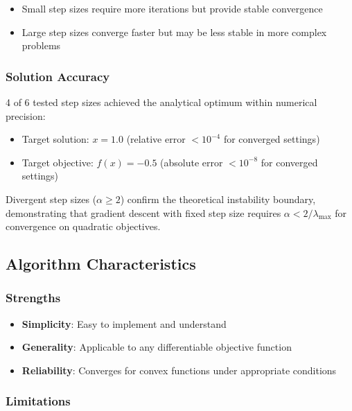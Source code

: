 \documentclass[
  english,
]{article}
\providecommand{\tightlist}{%
  \setlength{\itemsep}{0pt}\setlength{\parskip}{0pt}}
\begin{document}
\begin{itemize}
\tightlist
\item
  Small step sizes require more iterations but provide stable
  convergence
\item
  Large step sizes converge faster but may be less stable in more
  complex problems
\end{itemize}

\subsubsection{Solution Accuracy}\label{solution-accuracy}

4 of 6 tested step sizes achieved the analytical optimum within
numerical precision:

\begin{itemize}
\tightlist
\item
  Target solution: \(x = 1.0\) (relative error \(< 10^{-4}\) for
  converged settings)
\item
  Target objective: \(f(x) = -0.5\) (absolute error \(< 10^{-8}\) for
  converged settings)
\end{itemize}

Divergent step sizes (\(\alpha \geq 2\)) confirm the theoretical
instability boundary, demonstrating that gradient descent with fixed
step size requires \(\alpha < 2/\lambda_{\max}\) for convergence on
quadratic objectives.

\subsection{Algorithm Characteristics}\label{algorithm-characteristics}

\subsubsection{Strengths}\label{strengths}

\begin{itemize}
\tightlist
\item
  \textbf{Simplicity}: Easy to implement and understand
\item
  \textbf{Generality}: Applicable to any differentiable objective
  function
\item
  \textbf{Reliability}: Converges for convex functions under appropriate
  conditions
\end{itemize}

\subsubsection{Limitations}\label{limitations}
\end{document}
